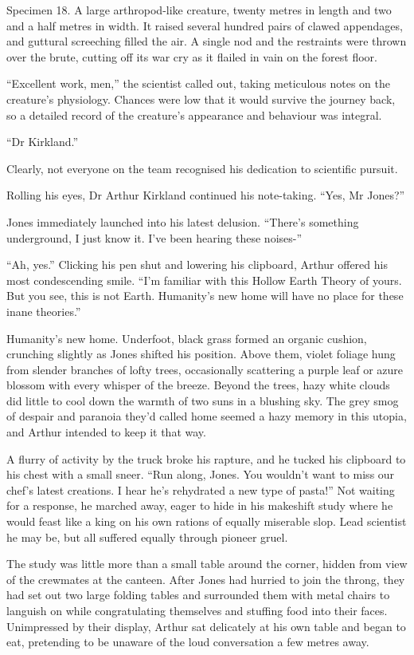 \noindent Specimen 18. A large arthropod-like creature, twenty metres in length and two and a half metres in width. It raised several hundred pairs of clawed appendages, and guttural screeching filled the air. A single nod and the restraints were thrown over the brute, cutting off its war cry as it flailed in vain on the forest floor. 

“Excellent work, men,” the scientist called out, taking meticulous notes on the creature’s physiology. Chances were low that it would survive the journey back, so a detailed record of the creature’s appearance and behaviour was integral. 

“Dr Kirkland.” 

Clearly, not everyone on the team recognised his dedication to scientific pursuit. 

Rolling his eyes, Dr Arthur Kirkland continued his note-taking. “Yes, Mr Jones?”  

Jones immediately launched into his latest delusion. “There’s something underground, I just know it. I’ve been hearing these noises-” 

“Ah, yes.” Clicking his pen shut and lowering his clipboard, Arthur offered his most condescending smile. “I’m familiar with this Hollow Earth Theory of yours. But you see, this is not Earth. Humanity’s new home will have no place for these inane theories.” 

Humanity’s new home. Underfoot, black grass formed an organic cushion, crunching slightly as Jones shifted his position. Above them, violet foliage hung from slender branches of lofty trees, occasionally scattering a purple leaf or azure blossom with every whisper of the breeze. Beyond the trees, hazy white clouds did little to cool down the warmth of two suns in a blushing sky. The grey smog of despair and paranoia they’d called home seemed a hazy memory in this utopia, and Arthur intended to keep it that way. 

A flurry of activity by the truck broke his rapture, and he tucked his clipboard to his chest with a small sneer. “Run along, Jones. You wouldn’t want to miss our chef’s latest creations. I hear he’s rehydrated a new type of pasta!” Not waiting for a response, he marched away, eager to hide in his makeshift study where he would feast like a king on his own rations of equally miserable slop. Lead scientist he may be, but all suffered equally through pioneer gruel. 

The study was little more than a small table around the corner, hidden from view of the crewmates at the canteen. After Jones had hurried to join the throng, they had set out two large folding tables and surrounded them with metal chairs to languish on while congratulating themselves and stuffing food into their faces. Unimpressed by their display, Arthur sat delicately at his own table and began to eat, pretending to be unaware of the loud conversation a few metres away. 

